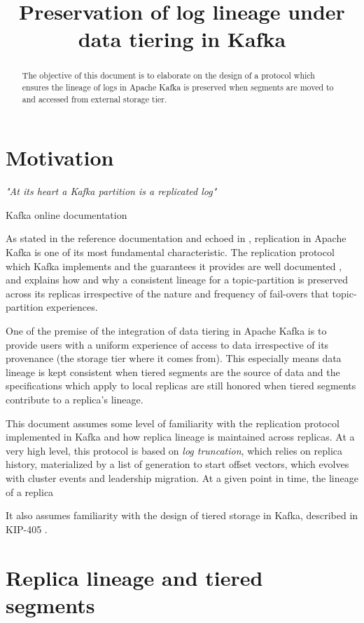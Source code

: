 \documentclass{article}
\title{Preservation of log lineage under data tiering in Kafka}
\begin{document}
\maketitle \thispagestyle{fancy2}
\begin{abstract}
	The objective of this document is to elaborate on the design of a protocol which ensures the lineage of logs in Apache Kafka is preserved  when segments are moved to and accessed from external storage tier.
\end{abstract}

\section{Motivation}
\epigraph{\textit{"At its heart a Kafka partition is a replicated log"}}{Kafka online documentation \cite{RD1}}

As stated in the reference documentation and echoed in \cite{KDG}, replication in Apache Kafka is one of its most fundamental characteristic. The replication protocol which Kafka implements and the guarantees it provides are well documented \cite{KIP101} \cite{KIP279}, and explains how and why a consistent lineage for a topic-partition is preserved across its replicas irrespective of the nature and frequency of fail-overs that topic-partition experiences. 

One of the premise of the integration of data tiering in Apache Kafka is to provide users with a uniform experience of access to data irrespective of its provenance (the storage tier where it comes from). This especially means data lineage is kept consistent when tiered segments are the source of data and the specifications which apply to local replicas are still honored when tiered segments contribute to a replica's lineage.

This document assumes some level of familiarity with the replication protocol implemented in Kafka and how replica lineage is maintained across replicas. At a very high level, this protocol is based on \textit{log truncation}, which relies on replica history, materialized by a list of generation to start offset vectors, which evolves with cluster events and leadership migration. At a given point in time, the lineage of a replica 

It also assumes familiarity with the design of tiered storage in Kafka, described in KIP-405 \cite{KIP405}.

\section{Replica lineage and tiered segments}
\end{document}
